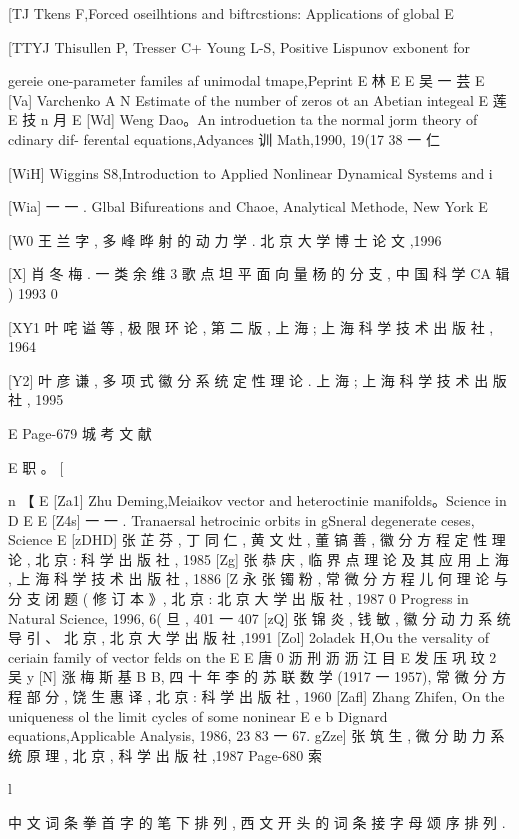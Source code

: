 [TJ Tkens F,Forced oseilhtions and biftrcstions: Applications of global
E

[TTYJ Thisullen P, Tresser C+ Young L-S, Positive Lispunov exbonent for

gereie one-parameter familes af unimodal tmape,Peprint
E 林 E
E 吴 一 芸
E
[Va] Varchenko A N Estimate of the number of zeros ot an Abetian integeal
E 莲
E 技 n
月
E
[Wd] Weng Dao。An introduetion ta the normal jorm theory of cdinary dif-
ferental equations,Adyances 训 Math,1990, 19(17 38 一 仁

[WiH] Wiggins S8,Introduction to Applied Nonlinear Dynamical Systems and
i

[Wia] 一 一 . Glbal Bifureations and Chaoe, Analytical Methode, New York
E

[W0 王 兰 字 , 多 峰 晔 射 的 动 力 学 . 北 京 大 学 博 士 论 文 ,1996

[X] 肖 冬 梅 . 一 类 余 维 3 歌 点 坦 平 面 向 量 杨 的 分 支 , 中 国 科 学 CA 辑 ) 1993
0

[XY1 叶 咤 谥 等 , 极 限 环 论 , 第 二 版 , 上 海 ; 上 海 科 学 技 术 出 版 社 , 1964

[Y2] 叶 彦 谦 , 多 项 式 徽 分 系 统 定 性 理 论 . 上 海 ; 上 海 科 学 技 术 出 版 社 , 1995

E
Page-679
城 考 文 献

E 职 。
[

n
【
E
[Za1] Zhu Deming,Meiaikov vector and heteroctinie manifolds。Science in
D
E
E
[Z4s] 一 一 . Tranaersal hetrocinic orbits in gSneral degenerate ceses, Science
E
[zDHD] 张 芷 芬 , 丁 同 仁 , 黄 文 灶 , 董 镐 善 , 徽 分 方 程 定 性 理 论 , 北 京 : 科 学
出 版 社 , 1985
[Zg] 张 恭 庆 , 临 界 点 理 论 及 其 应 用 上 海 , 上 海 科 学 技 术 出 版 社 , 1886
[Z 永 张 镯 粉 , 常 微 分 方 程 儿 何 理 论 与 分 支 闭 题 ( 修 订 本 》, 北 京 : 北 京 大 学 出
版 社 , 1987
0
Progress in Natural Science, 1996, 6( 旦 , 401 一 407
[zQ] 张 锦 炎 , 钱 敏 , 徽 分 动 力 系 统 导 引 、 北 京 , 北 京 大 学 出 版 社 ,1991
[Zol] 2oladek H,Ou the versality of ceriain family of vector felds on the
E
E 唐 0 沥 刑 沥 沥 江 目
E 发 压 巩 玟 2 吴 y
[N] 涨 梅 斯 基 B B, 四 十 年 李 的 苏 联 数 学 (1917 一 1957), 常 微 分 方 程 部 分 ,
饶 生 惠 译 , 北 京 : 科 学 出 版 社 , 1960
[Zafl] Zhang Zhifen, On the uniqueness ol the limit cycles of some noninear
E
e
b
Dignard equations,Applicable Analysis, 1986, 23 83 一 67.
gZze] 张 筑 生 , 微 分 助 力 系 统 原 理 , 北 京 , 科 学 出 版 社 ,1987
Page-680
索

l

中 文 词 条 拳 首 字 的 笔 下 排 列 , 西 文 开 头 的 词 条 接 字 母 颂 序 排 列 .

